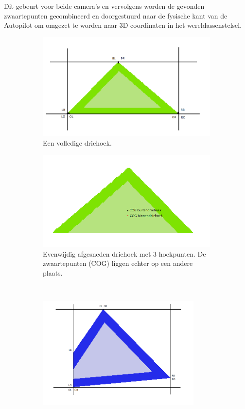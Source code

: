 Dit gebeurt voor beide camera's en vervolgens worden de gevonden zwaartepunten gecombineerd en doorgestuurd naar de fysische kant van de Autopilot om omgezet te worden naar 3D coordinaten in het wereldassenstelsel.
\\
\begin{figure}[h]
	\begin{subfigure}{0.33\textwidth}
	\centering
	\includegraphics[width=1\textwidth]{GoedeDriehoek.png}
	\caption{Een volledige driehoek.}
	\label{fig:GoedeDriehoek}
	\end{subfigure}
	\begin{subfigure}{0.33\textwidth}
	\centering
	\includegraphics[width=1\textwidth]{GoedAfgesnedenDriehoek.png}
	\caption{Evenwijdig afgesneden driehoek met 3 hoekpunten. De zwaartepunten (COG) liggen echter op een andere plaats.}
	\label{fig:GoedAfgesnedenDriehoek}
	\end{subfigure}
	\
	\begin{subfigure}{0.33\textwidth}
		\centering
		\includegraphics[width=0.9\textwidth]{SlechtAfgesnedenDriehoek.png}

\end{subfigure}
\end{figure}
